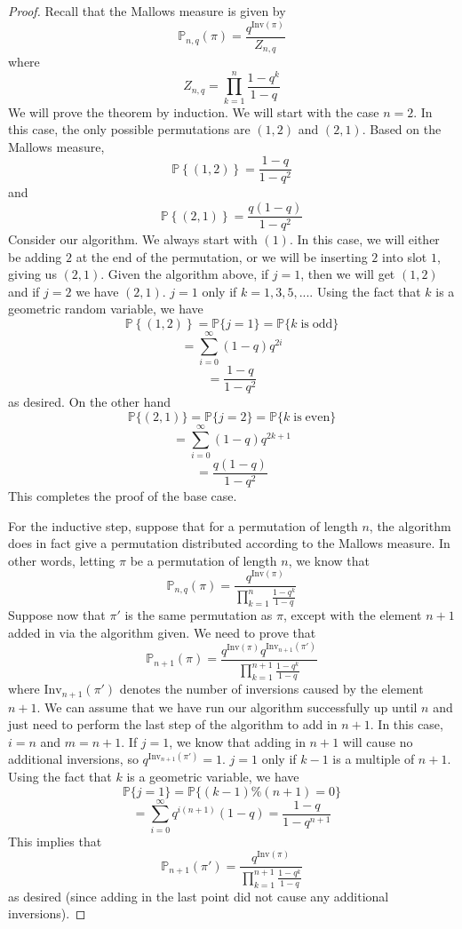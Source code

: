\documentclass[12pt]{report}
\theoremstyle{definition}
\begin{document}
\begin{proof}
Recall that the Mallows measure is given by 
$$
\mathbb{P}_{n,q}(\pi)=\frac{q^{\mathrm{Inv}(\pi)}}{Z_{n,q}}
$$
where
$$
Z_{n,q}=\prod_{k=1}^n\frac{1-q^k}{1-q}
$$
We will prove the theorem by induction.  We will start with the case $n=2$.  In this case, the only possible permutations are $(1,2)$ and $(2,1)$.  Based on the Mallows measure, 
$$
\mathbb{P}\left \{(1,2)\right\}=\frac{1-q}{1-q^2}
$$
and 
$$
\mathbb{P}\left\{(2,1)\right\}=\frac{q(1-q)}{1-q^2}
$$
Consider our algorithm.  We always start with $(1)$.  In this case, we will either be adding $2$ at the end of the permutation, or we will be inserting $2$ into slot $1$, giving us $(2,1)$.  Given the algorithm above, if $j=1$, then we will get $(1,2)$ and if $j=2$ we have $(2,1)$.  $j=1$ only if $k=1,3,5,...$.  Using the fact that $k$ is a geometric random variable, we have 
$$
\mathbb{P}\left\{(1,2)\right\}=\mathbb{P}\{j=1\}=\mathbb{P}\{k\; \mathrm{is} \;\mathrm{odd}\}
$$
$$
=\sum_{i=0}^{\infty}(1-q)q^{2i}
$$
$$
=\frac{1-q}{1-q^2}
$$
as desired.  On the other hand 
$$
\mathbb{P}\{(2,1)\}=\mathbb{P}\{j=2\}=\mathbb{P}\{k\; \mathrm{is}\;\mathrm{even}\}
$$
$$
=\sum_{i=0}^{\infty}(1-q)q^{2k+1}
$$
$$
=\frac{q(1-q)}{1-q^2}
$$
This completes the proof of the base case.   

For the inductive step, suppose that for a permutation of length $n$, the algorithm does in fact give a permutation distributed according to the Mallows measure.  In other words, letting $\pi$ be a permutation of length $n$, we know that 
$$
\mathbb{P}_{n,q}(\pi)=\frac{q^{\mathrm{Inv}(\pi)}}{\prod_{k=1}^n\frac{1-q^k}{1-q}}
$$
Suppose now that $\pi '$ is the same permutation as $\pi$, except with the element $n+1$ added in via the algorithm given.  We need to prove that 
$$
\mathbb{P}_{n+1}(\pi)=\frac{q^{\mathrm{Inv}(\pi)}q^{\mathrm{Inv}_{n+1}(\pi ')}}{\prod_{k=1}^{n+1}\frac{1-q^k}{1-q}}
$$
where 
$\mathrm{Inv}_{n+1}(\pi ')$ denotes the number of inversions caused by the element $n+1$.
We can assume that we have run our algorithm successfully up until $n$ and just need to perform the last step of the algorithm to add in $n+1$.  In this case, $i=n$ and $m=n+1$.  If $j=1$, we know that adding in $n+1$ will cause no additional inversions, so $q^{\mathrm{Inv}_{n+1}(\pi ')}=1$.    $j=1$ only if $k-1$ is a multiple of $n+1$.  Using the fact that $k$ is a geometric variable, we have 
$$
\mathbb{P}\{j=1\}=\mathbb{P}\{(k-1)\%(n+1)=0\}
$$
$$
=\sum_{i=0}^{\infty}q^{i(n+1)}(1-q)=\frac{1-q}{1-q^{n+1}}
$$
This implies that 
$$
\mathbb{P}_{n+1}(\pi')=\frac{q^{\mathrm{Inv}(\pi)}}{\prod_{k=1}^{n+1}\frac{1-q^k}{1-q}}
$$
as desired (since adding in the last point did not cause any additional inversions).


\end{proof}
\end{document}
